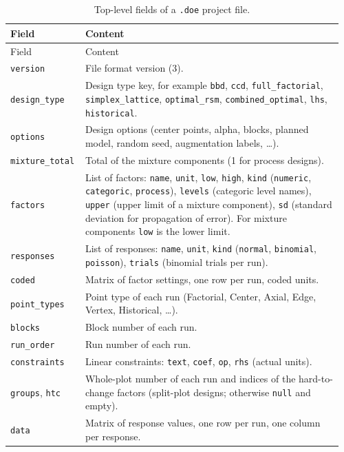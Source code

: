 {\small\begin{longtable}{@{}p{0.2\linewidth}p{0.76\linewidth}@{}}
\caption{Top-level fields of a \texttt{.doe} project file.}\label{tab:a-file}\\
\toprule
Field & Content \\
\midrule
\endfirsthead
\toprule
Field & Content \\
\midrule
\endhead
\bottomrule
\endfoot
\texttt{version} & File format version (3). \\
\texttt{design\_type} & Design type key, for example \texttt{bbd}, \texttt{ccd}, \texttt{full\_factorial},
  \texttt{simplex\_lattice}, \texttt{optimal\_rsm}, \texttt{combined\_optimal}, \texttt{lhs}, \texttt{historical}. \\
\texttt{options} & Design options (center points, alpha, blocks, planned model, random seed, augmentation labels,
  \dots). \\
\texttt{mixture\_total} & Total of the mixture components (1 for process designs). \\
\texttt{factors} & List of factors: \texttt{name}, \texttt{unit}, \texttt{low}, \texttt{high}, \texttt{kind}
  (\texttt{numeric}, \texttt{categoric}, \texttt{process}), \texttt{levels} (categoric level names), \texttt{upper}
  (upper limit of a mixture component), \texttt{sd} (standard deviation for propagation of error). For mixture
  components \texttt{low} is the lower limit. \\
\texttt{responses} & List of responses: \texttt{name}, \texttt{unit}, \texttt{kind} (\texttt{normal},
  \texttt{binomial}, \texttt{poisson}), \texttt{trials} (binomial trials per run). \\
\texttt{coded} & Matrix of factor settings, one row per run, coded units. \\
\texttt{point\_types} & Point type of each run (Factorial, Center, Axial, Edge, Vertex, Historical, \dots). \\
\texttt{blocks} & Block number of each run. \\
\texttt{run\_order} & Run number of each run. \\
\texttt{constraints} & Linear constraints: \texttt{text}, \texttt{coef}, \texttt{op}, \texttt{rhs} (actual
  units). \\
\texttt{groups}, \texttt{htc} & Whole-plot number of each run and indices of the hard-to-change factors
  (split-plot designs; otherwise \texttt{null} and empty). \\
\texttt{data} & Matrix of response values, one row per run, one column per response. \\

\end{longtable}}
